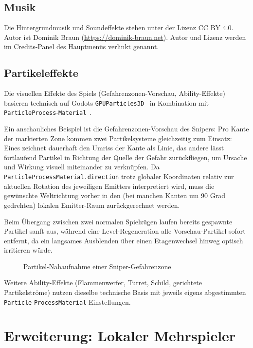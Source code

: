 \documentclass[oneside]{ausarbeitung}
\begin{document}
\section{Musik}

Die Hintergrundmusik und Soundeffekte stehen unter der Lizenz CC BY 4.0. Autor ist Dominik Braun (\url{https://dominik-braun.net}). Autor und Lizenz werden im Credits-Panel des Hauptmenüs verlinkt genannt.

\section{Partikeleffekte}

Die visuellen Effekte des Spiels (Gefahrenzonen-Vorschau, Ability-Effekte) basieren technisch auf
Godots \texttt{GPUParticles3D}~\cite{godot:particles} in Kombination mit \texttt{ParticleProcess}-\texttt{Material}~\cite{godot:particleprocessmaterial}.

Ein anschauliches Beispiel ist die Gefahrenzonen-Vorschau des Snipers: Pro Kante der markierten
Zone kommen zwei Partikelsysteme gleichzeitig zum Einsatz: Eines zeichnet dauerhaft den Umriss der
Kante als Linie, das andere lässt fortlaufend Partikel in Richtung der Quelle der Gefahr zurückfliegen, um Ursache und Wirkung visuell miteinander zu
verknüpfen. Da \texttt{ParticleProcessMaterial.direction} trotz globaler Koordinaten relativ zur
aktuellen Rotation des jeweiligen Emitters interpretiert wird, muss die gewünschte Weltrichtung vorher
in den (bei manchen Kanten um 90 Grad gedrehten) lokalen Emitter-Raum zurückgerechnet werden.

Beim Übergang zwischen zwei normalen Spielzügen laufen bereits gespawnte Partikel sanft aus, während eine Level-Regeneration alle Vorschau-Partikel sofort entfernt, da ein langsames Ausblenden über einen Etagenwechsel hinweg optisch irritieren würde.

\begin{figure}[h]
    \centering
    \caption{Partikel-Nahaufnahme einer Sniper-Gefahrenzone}
    \label{fig:partikel-nahaufnahme}
\end{figure}

Weitere Ability-Effekte (Flammenwerfer, Turret, Schild, gerichtete Partikelströme) nutzen dieselbe
technische Basis mit jeweils eigens abgestimmten \texttt{Particle}-\texttt{ProcessMaterial}-Einstellungen.


\chapter{Erweiterung: Lokaler Mehrspieler}
\label{cha:coop-konzept}
\end{document}
